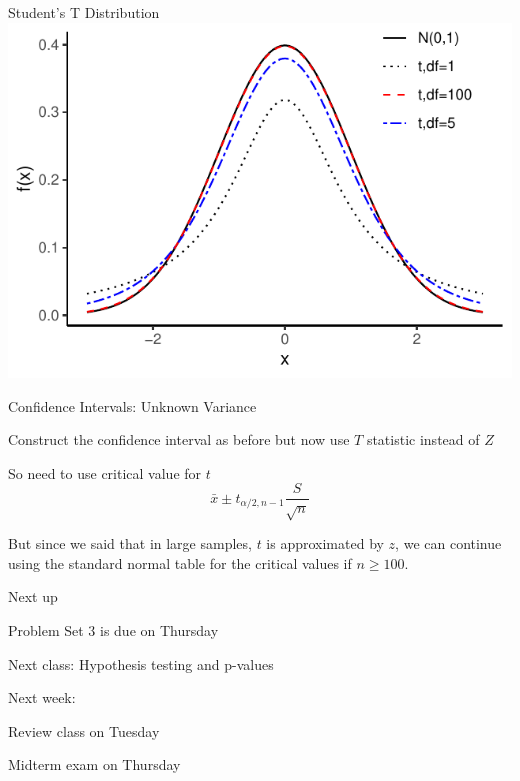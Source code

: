 \documentclass{./../div_teaching_slides}
\begin{document}
\begin{frame}{Student's T Distribution}
\centering
	\includegraphics{./../../Output/tdist.pdf} 
\end{frame}

\begin{frame}{Confidence Intervals: Unknown Variance}
\begin{witemize}
  \item Construct the confidence interval as before but now use $T$ statistic instead of $Z$
  \item So need to use critical value for $t$
  $$ \bar{x} \pm  t_{\alpha/2,n-1}  \frac{S}{\sqrt{n}}$$
 \item But since we said that in large samples, $t$ is approximated by $z$, we can continue using the standard normal table for the critical values if $n \geq 100$. 
\end{witemize}
\end{frame}


\begin{frame}{Next up}
\vspace{-0.5em}
\begin{witemize}
  \item Problem Set 3 is due on Thursday
  \item Next class: Hypothesis testing and p-values
  \item Next week: \\
  \begin{witemize}
  \normalsize
  \item Review class on Tuesday 
  \item Midterm exam on Thursday 
\end{witemize}
\end{witemize}
\end{frame}
\end{document}
